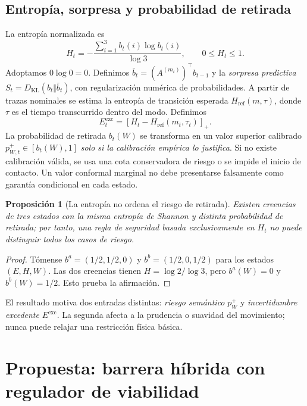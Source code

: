 \documentclass[10pt,a4paper,twocolumn]{article}
\newtheorem{proposition}{Proposición}
\begin{document}
\subsection{Entropía, sorpresa y probabilidad de retirada}
La entropía normalizada es
\begin{equation}
 H_t=-\frac{\sum_{i=1}^{3}b_t(i)\log b_t(i)}{\log 3},\qquad 0\le H_t\le1.
 \label{eq:entropy}
\end{equation}
Adoptamos $0\log0=0$. Definimos $\bar b_t=(A^{(m_t)})^\top b_{t-1}$ y la \emph{sorpresa predictiva} $S_t=D_{\mathrm{KL}}(b_t\Vert\bar b_t)$, con regularización numérica de probabilidades. A partir de trazas nominales se estima la entropía de transición esperada $H_{\mathrm{ref}}(m,\tau)$, donde $\tau$ es el tiempo transcurrido dentro del modo. Definimos
\begin{equation}
 E_t^{\mathrm{exc}}=\left[H_t-H_{\mathrm{ref}}(m_t,\tau_t)\right]_+.
 \label{eq:excess}
\end{equation}
La probabilidad de retirada $b_t(W)$ se transforma en un valor superior calibrado $p^+_{W,t}\in[b_t(W),1]$ \emph{solo si la calibración empírica lo justifica}. Si no existe calibración válida, se usa una cota conservadora de riesgo o se impide el inicio de contacto. Un valor conformal marginal no debe presentarse falsamente como garantía condicional en cada estado.

\begin{proposition}[La entropía no ordena el riesgo de retirada]
Existen creencias de tres estados con la misma entropía de Shannon y distinta probabilidad de retirada; por tanto, una regla de seguridad basada exclusivamente en $H_t$ no puede distinguir todos los casos de riesgo.
\end{proposition}
\begin{proof}
Tómense $b^a=(1/2,1/2,0)$ y $b^b=(1/2,0,1/2)$ para los estados $(E,H,W)$. Las dos creencias tienen $H=\log2/\log3$, pero $b^a(W)=0$ y $b^b(W)=1/2$. Esto prueba la afirmación.
\end{proof}
El resultado motiva dos entradas distintas: \emph{riesgo semántico} $p_W^+$ y \emph{incertidumbre excedente} $E^{\mathrm{exc}}$. La segunda afecta a la prudencia o suavidad del movimiento; nunca puede relajar una restricción física básica.

\section{Propuesta: barrera híbrida con regulador de viabilidad}
\end{document}
